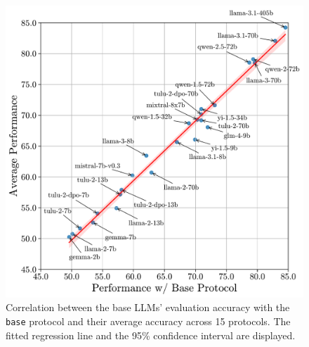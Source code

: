 \documentclass[11pt]{article}
\begin{document}
\begin{figure}[t!]
    \centering
    \includegraphics[width=1\linewidth]{figures/protocol_analysis_performance_compare.pdf}
 \caption{\label{fig:protocol-performance-compare}Correlation between the base LLMs' evaluation accuracy with the \texttt{base} protocol and their average accuracy across 15 protocols. The fitted regression line and the 95\% confidence interval are displayed.
    }
\end{figure}
\end{document}
